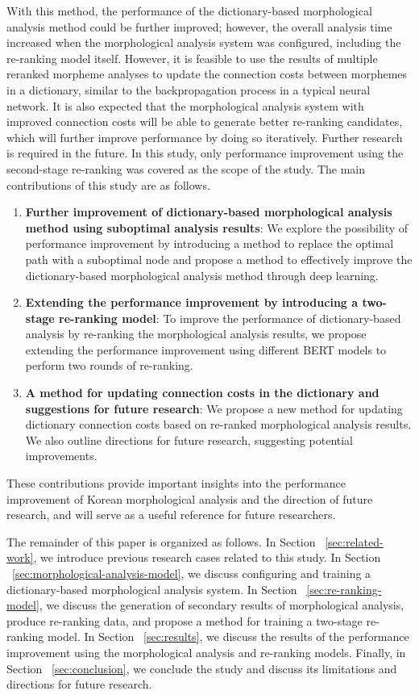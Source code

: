\documentclass[AMS,STIX2COL]{WileyNJD-v2}
\begin{document}
    With this method, the performance of the dictionary-based morphological analysis method could be further improved; however, the overall analysis time increased when the morphological analysis system was configured, including the re-ranking model itself.
    However, it is feasible to use the results of multiple reranked morpheme analyses to update the connection costs between morphemes in a dictionary, similar to the backpropagation process in a typical neural network.
    It is also expected that the morphological analysis system with improved connection costs will be able to generate better re-ranking candidates, which will further improve performance by doing so iteratively.
    Further research is required in the future.
    In this study, only performance improvement using the second-stage re-ranking was covered as the scope of the study.
    The main contributions of this study are as follows.
    \begin{enumerate}
        \item \textbf{Further improvement of dictionary-based morphological analysis method using suboptimal analysis results}: We explore the possibility of performance improvement by introducing a method to replace the optimal path with a suboptimal node and propose a method to effectively improve the dictionary-based morphological analysis method through deep learning.
        \item \textbf{Extending the performance improvement by introducing a two-stage re-ranking model}: To improve the performance of dictionary-based analysis by re-ranking the morphological analysis results, we propose extending the performance improvement using different BERT models to perform two rounds of re-ranking.
        \item \textbf{A method for updating connection costs in the dictionary and suggestions for future research}: We propose a new method for updating dictionary connection costs based on re-ranked morphological analysis results. We also outline directions for future research, suggesting potential improvements.
    \end{enumerate}
    These contributions provide important insights into the performance improvement of Korean morphological analysis and the direction of future research, and will serve as a useful reference for future researchers.

    The remainder of this paper is organized as follows.
    In Section ~\ref{sec:related-work}, we introduce previous research cases related to this study.
    In Section ~\ref{sec:morphological-analysis-model}, we discuss configuring and training a dictionary-based morphological analysis system.
    In Section ~\ref{sec:re-ranking-model}, we discuss the generation of secondary results of morphological analysis, produce re-ranking data, and propose a method for training a two-stage re-ranking model.
    In Section ~\ref{sec:results}, we discuss the results of the performance improvement using the morphological analysis and re-ranking models.
    Finally, in Section ~\ref{sec:conclusion}, we conclude the study and discuss its limitations and directions for future research.
\end{document}
